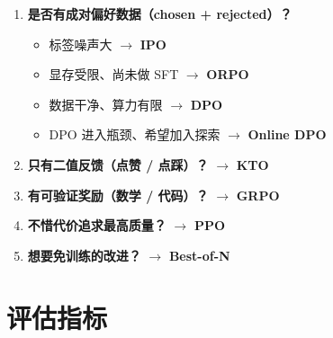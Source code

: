 \begin{enumerate}
  \item \textbf{是否有成对偏好数据（chosen + rejected）？}

\begin{itemize}
  \item 标签噪声大 $\rightarrow$ \textbf{IPO}
  \item 显存受限、尚未做 SFT $\rightarrow$ \textbf{ORPO}
  \item 数据干净、算力有限 $\rightarrow$ \textbf{DPO}
  \item DPO 进入瓶颈、希望加入探索 $\rightarrow$ \textbf{Online DPO}
\end{itemize}
  \item \textbf{只有二值反馈（点赞 / 点踩）？} $\rightarrow$ \textbf{KTO}
  \item \textbf{有可验证奖励（数学 / 代码）？} $\rightarrow$ \textbf{GRPO}
  \item \textbf{不惜代价追求最高质量？} $\rightarrow$ \textbf{PPO}
  \item \textbf{想要免训练的改进？} $\rightarrow$ \textbf{Best-of-N}
\end{enumerate}

\section{评估指标}
\label{evaluation-metrics}

